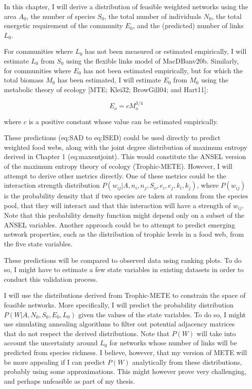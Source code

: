 In this chapter, I will derive a distribution of feasible weighted networks
using the area $A_0$, the number of species $S_0$, the total number of
individuals $N_0$, the total energetic requirement of the community $E_0$, and
the (predicted) number of links $L_0$. 

For communities where $L_0$ has not been measured or estimated empirically, I
will estimate $L_0$ from $S_0$ using the flexible links model of MacDBanv20b.
Similarly, for communities where $E_0$ has not been estimated empirically, but
for which the total biomass $M_0$ has been estimated, I will estimate $E_0$ from
$M_0$ using the metabolic theory of ecology [MTE; Klei32; BrowGill04; and
Hart11]:



$$E_o = cM_o^{3/4}$$

where $c$ is a positive constant whose value can be estimated empirically.

These predictions (eq:SAD to eq:ISED) could be used directly to predict
weighted food webs, along with the joint degree distribution of maximum entropy
derived in Chapter 1 (eq:maxentjoint). This would constitute the ANSEL version
of the maximum entropy theory of ecology (Trophic-METE). However, I will attempt
to derive other metrics directly. One of these metrics could be the interaction
strength distribution $P(w_{ij}|A, n_i, n_j, S_o, e_i, e_j, k_i, k_j)$, where
$P(w_{ij})$ is the probability density that if two species are taken at random
from the species pool, that they will interact and that this interaction will
have a strength of $w_{ij}$. Note that this probability density function might
depend only on a subset of the ANSEL variables. Another approach could be to
attempt to predict emerging network properties, such as the distribution of
trophic levels in a food web, from the five state variables.

These predictions will be compared to observed data using ranking plots. To do
so, I might have to estimate a few state variables in existing datasets in order
to conduct this validation process.

I will use the distributions derived from Trophic-METE to constrain the space of
feasible networks. More specifically, I will predict the probability
distribution $P(W|A, N_0, S_0, E_0, L_0)$ given the values of the state
variables. To do so, I might use simulating annealing algorithms to filter out
potential adjacency matrices that do not respect the derived distributions. Note
that $P(W)$ will take into account the uncertainty around $L_0$ for networks
whose number of links will be predicted from species richness. I believe,
however, that my version of METE will be more appealing if I can predict $P(W)$
analytically from these distributions, probably using some approximations. This
might however prove very challenging, and perhaps unfeasible as part of my
thesis.

